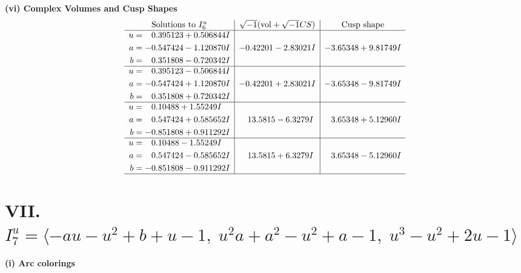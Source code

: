 \documentclass[1p]{elsarticle_modified}
\theoremstyle{definition}
\newcommand{\I}{\sqrt{-1}}
\begin{document}
\newpage\flushleft \textbf{(vi) Complex Volumes and Cusp Shapes}
$$\begin{array}{c|c|c}  
\text{Solutions to }I^u_{6}& \I (\text{vol} + \sqrt{-1}CS) & \text{Cusp shape}\\
 \hline 
\begin{aligned}
u &= \phantom{-}0.395123 + 0.506844 I \\
a &= -0.547424 - 1.120870 I \\
b &= \phantom{-}0.351808 - 0.720342 I\end{aligned}
 & -0.42201 - 2.83021 I & -3.65348 + 9.81749 I \\ \hline\begin{aligned}
u &= \phantom{-}0.395123 - 0.506844 I \\
a &= -0.547424 + 1.120870 I \\
b &= \phantom{-}0.351808 + 0.720342 I\end{aligned}
 & -0.42201 + 2.83021 I & -3.65348 - 9.81749 I \\ \hline\begin{aligned}
u &= \phantom{-}0.10488 + 1.55249 I \\
a &= \phantom{-}0.547424 + 0.585652 I \\
b &= -0.851808 + 0.911292 I\end{aligned}
 & \phantom{-}13.5815 - 6.3279 I & \phantom{-}3.65348 + 5.12960 I \\ \hline\begin{aligned}
u &= \phantom{-}0.10488 - 1.55249 I \\
a &= \phantom{-}0.547424 - 0.585652 I \\
b &= -0.851808 - 0.911292 I\end{aligned}
 & \phantom{-}13.5815 + 6.3279 I & \phantom{-}3.65348 - 5.12960 I\\
 \hline 
 \end{array}$$\newpage\newpage\renewcommand{\arraystretch}{1}
\centering \section*{VII. $I^u_{7}= \langle - a u- u^2+b+u-1,\;u^2 a+a^2- u^2+a-1,\;u^3- u^2+2 u-1 \rangle$}
\flushleft \textbf{(i) Arc colorings}\\
\end{document}
